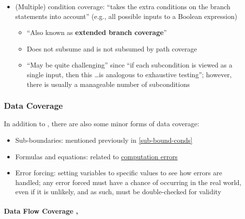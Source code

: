 \begin{itemize}
\begin{itemize}
            \end{itemize}
      \item (Multiple) condition coverage: ``takes the extra conditions on the
            branch statements into account'' (e.g., all possible inputs to a
            Boolean expression) \cite[p.~120]{patton_software_2006}
            \begin{itemize}
                  \item ``Also known as \textbf{extended branch coverage}''
                        \cite[p.~422]{van_vliet_software_2000}
                  \item Does not subsume and is not subsumed by path coverage
                        \cite[p.~433]{van_vliet_software_2000}
                  \item ``May be quite challenging'' since ``if each
                        subcondition is viewed as a single input, then this
                        \dots is analogous to exhaustive testing''; however,
                        there is usually a manageable number of subconditions
                        \cite[p.~464]{peters_software_2000}
            \end{itemize}
\end{itemize}

\subsubsection{Data Coverage \cite[pp.~114-116]{patton_software_2006}}

In addition to , there are also some minor forms of
data coverage:

\begin{itemize}
      \item Sub-boundaries: mentioned previously in \ref{sub-bound-conds}
      \item Formulas and equations: related to
            \hyperref[comp-errors]{computation errors}
      \item Error forcing: setting variables to specific values to see how
            errors are handled; any error forced must have a chance of
            occurring in the real world, even if it is unlikely, and as such,
            must be double-checked for validity
            \cite[p.~116]{patton_software_2006}
\end{itemize}

\paragraph{Data Flow Coverage \cite[p.~114]{patton_software_2006},
      \cite[pp.~424-425]{van_vliet_software_2000}}
\label{data-flow-coverage}

